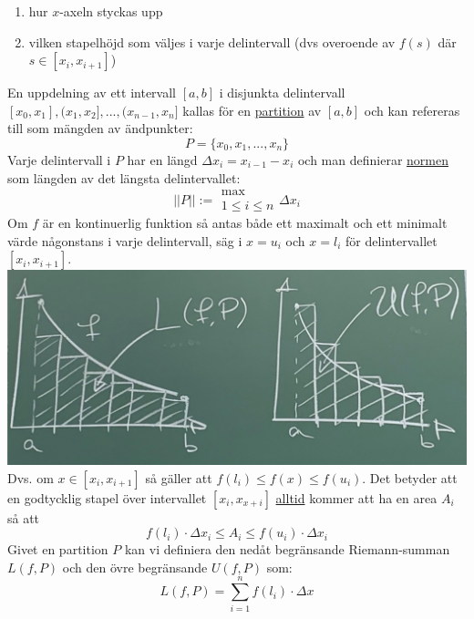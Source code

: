 \begin{enumerate}
    \item hur $x$-axeln styckas upp
    \item vilken stapelhöjd som väljes i varje delintervall (dvs overoende av $f(s)$ där $s\in[x_i,x_{i+1}]$)
\end{enumerate}
En uppdelning av ett intervall $[a,b]$ i disjunkta delintervall $[x_0,x_1],(x_1,x_2],...,(x_{n-1},x_n]$ kallas för en \underline{partition} av $[a,b]$ och kan refereras till som mängden av ändpunkter:
\begin{equation*}
    P=\{x_0,x_1,...,x_n\}
\end{equation*}
Varje delintervall i $P$ har en längd $\Delta x_i=x_{i-1}-x_i$ och man definierar \underline{normen} som längden av det längsta delintervallet:
\begin{equation*}
    ||P||:=\begin{matrix}
        \text{max} \\
        1\leq i \leq n
    \end{matrix}\Delta x_i
\end{equation*}
Om $f$ är en kontinuerlig funktion så antas både ett maximalt och ett minimalt värde någonstans i varje delintervall, säg i $x=u_i$ och $x=l_i$ för delintervallet $[x_i,x_{i+1}]$.
\includegraphics[scale=0.1]{lessons/lesson14/imgs/img03.jpg}
Dvs. om $x\in[x_i,x_{i+1}]$ så gäller att $f(l_i)\leq f(x)\leq f(u_i)$.
Det betyder att en godtycklig stapel över intervallet $[x_i,x_{x+i}]$ \underline{alltid} kommer att ha en area $A_i$ så att
\begin{equation*}
    f(l_i)\cdot\Delta x_i\leq A_i\leq f(u_i)\cdot\Delta x_i
\end{equation*}
Givet en partition $P$ kan vi definiera den nedåt begränsande Riemann-summan $L(f,P)$ och den övre begränsande $U(f,P)$ som:
\begin{equation*}
    L(f,P)=\sum_{i=1}^n f(l_i)\cdot\Delta x
\end{equation*}

